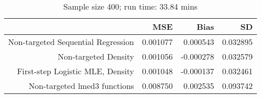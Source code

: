 \begin{table}[ht]
\centering
\caption{Sample size 400; run time: 33.84 mins} 
\begin{tabular}{rrrr}
  \hline
 & MSE & Bias & SD \\ 
  \hline
Non-targeted Sequential Regression & 0.001077 & 0.000543 & 0.032895 \\ 
  Non-targeted Density & 0.001056 & -0.000278 & 0.032579 \\ 
  First-step Logistic MLE, Density & 0.001048 & -0.000137 & 0.032461 \\ 
  Non-targeted lmed3 functions & 0.008750 & 0.002535 & 0.093742 \\ 
   \hline
\end{tabular}
\end{table}
